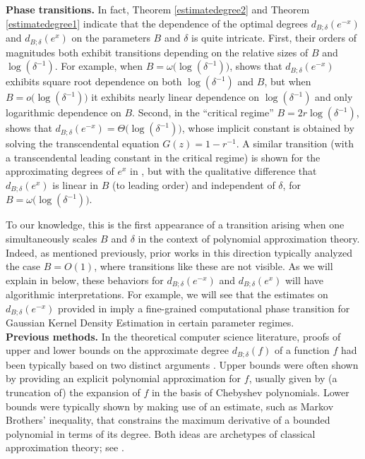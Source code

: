 \documentclass[10pt,a4paper]{article}
\theoremstyle{plain}\newtheorem{theorem}{Theorem}
\theoremstyle{definition}
\begin{document}
 \textbf{Phase transitions.} In fact, Theorem \ref{estimatedegree2} and Theorem \ref{estimatedegree1} indicate that the dependence of the optimal degrees $d_{B; \delta} (e^{-x})$ and $d_{B; \delta} (e^{x})$ on the parameters $B$ and $\delta$ is quite intricate. First, their orders of magnitudes both exhibit transitions depending on the relative sizes of $B$ and $\log (\delta^{-1})$. For example, when $B = \omega \big( \log (\delta^{-1}) \big)$,  shows that $d_{B; \delta} (e^{-x})$ exhibits square root dependence on both $\log (\delta^{-1})$ and $B$, but when $B = o \big( \log (\delta^{-1}) \big)$ it exhibits nearly linear dependence on $\log (\delta^{-1})$ and only logarithmic dependence on $B$. Second, in the ``critical regime'' $B = 2r \log (\delta^{-1})$,  shows that $d_{B; \delta} (e^{-x}) = \Theta \big( \log (\delta^{-1}) \big)$, whose implicit constant is obtained by solving the transcendental equation $G(z) = 1 - r^{-1}$. A similar transition (with a transcendental leading constant in the critical regime) is shown for the approximating degrees of $e^x$ in , but with the qualitative difference that $d_{B; \delta} (e^x)$ is linear in $B$ (to leading order) and independent of $\delta$, for $B = \omega \big( \log (\delta^{-1}) \big)$. 

To our knowledge, this is the first appearance of a transition arising when one simultaneously scales $B$ and $\delta$ in the context of polynomial approximation theory. Indeed, as mentioned previously, prior works in this direction typically analyzed the case $B = O (1)$, where transitions like these are not visible. As we will explain in  below, these behaviors for $d_{B; \delta} (e^{-x})$ and  $d_{B; \delta} (e^{x})$ will have algorithmic interpretations. For example, we will see that the estimates on  $d_{B; \delta} (e^{-x})$ provided in  imply a fine-grained computational phase transition for Gaussian Kernel Density Estimation in certain parameter regimes. \\


\textbf{Previous methods.} In the theoretical computer science literature, proofs of upper and lower bounds on the approximate degree $d_{B; \delta} (f)$ of a function $f$ had been typically based on two distinct arguments \cite{nisan1994degree,shi2002approximating, aaronson2004quantum, ambainis2005polynomial, orecchia2012approximating, sachdeva2014faster, bun2015dual}.  Upper bounds were often shown by providing an explicit polynomial approximation for $f$, usually given by (a truncation of) the expansion of $f$ in the basis of Chebyshev polynomials. Lower bounds were typically shown by making use of an estimate, such as Markov Brothers' inequality, that constrains the maximum derivative of a bounded polynomial in terms of its degree. Both ideas are archetypes of classical approximation theory; see \cite[{Chapters 2 and 4}]{TAFRV}. \\
\end{document}
